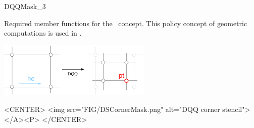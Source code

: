 \ccRefPageEnd






\ccRefPageBegin

\begin{ccRefConcept}{DQQMask_3}
\label{pageDQQMaskRef}  

Required member functions for the \ccRefName\ concept. This
policy concept of geometric computations is used in
.





\ccOperations
{}


\begin{ccTexOnly}
  \begin{center}
    \parbox{0.55\textwidth}{%
      \includegraphics[width=0.55\textwidth]{Subdivision_method_3_ref/FIG/DSCornerMask}%
    }
  \end{center}
\end{ccTexOnly}

\begin{ccHtmlOnly}
    <CENTER>
      <img src="FIG/DSCornerMask.png" alt="DQQ corner stencil"></A><P>
    </CENTER>
\end{ccHtmlOnly}

\ccHasModels


\ccSeeAlso


\end{ccRefConcept}

